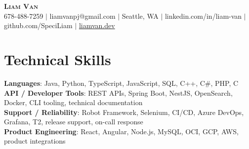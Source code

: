 \documentclass[letterpaper,11pt]{article}
\begin{document}

%
\begin{center}
    \textbf{\Huge \scshape Liam Van} \\ \vspace{1pt}
    \small 678-488-7259 $|$ \small {liamvanpj@gmail.com} $|$ Seattle, WA
 {{$|$ linkedin.com/in/liam-van} {$|$ github.com/SpeciLiam} {$|$ \href{https://liamvan.dev}{liamvan.dev}}}

\end{center}

\section{Technical Skills}
 \begin{itemize}[leftmargin=0.15in, label={}]
    \small{\item{
     \textbf{Languages}{: Java, Python, TypeScript, JavaScript, SQL, C++, C\#, PHP, C} \\
     \textbf{API / Developer Tools}{: REST APIs, Spring Boot, NestJS, OpenSearch, Docker, CLI tooling, technical documentation} \\
     \textbf{Support / Reliability}{: Robot Framework, Selenium, CI/CD, Azure DevOps, Grafana, T2, release support, on-call response} \\
     \textbf{Product Engineering}{: React, Angular, Node.js, MySQL, OCI, GCP, AWS, product integrations} \\
    }}
 \end{itemize}
%

\end{document}
